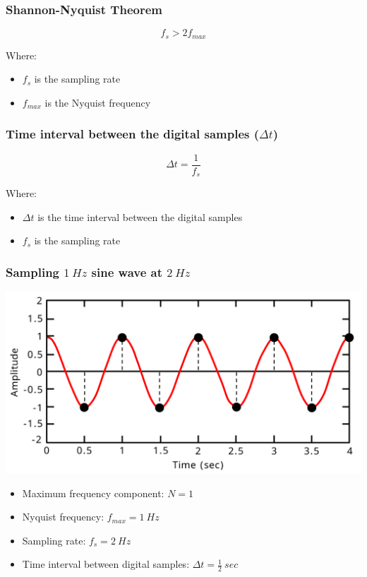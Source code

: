 \documentclass[11pt]{article}
\begin{document}
\subsubsection{Shannon-Nyquist Theorem}
\label{sec:org3bcc8e0}
\[f_s > 2f_{max}\]

Where:
\begin{itemize}
\item \(f_s\) is the sampling rate
\item \(f_{max}\) is the Nyquist frequency
\end{itemize}
\subsubsection{Time interval between the digital samples (\(\Delta t\))}
\label{sec:org41d8989}
\[\Delta t = \frac{1}{f_s}\]

Where:
\begin{itemize}
\item \(\Delta t\) is the time interval between the digital samples
\item \(f_s\) is the sampling rate
\end{itemize}
\subsubsection{Sampling \(\qty{1}{Hz}\) sine wave at \(\qty{2}{Hz}\)}
\label{sec:org871a238}
\begin{center}
\includegraphics[width=.9\linewidth]{./images/sampling-1hz-sine-wave-at-2hz.png}
\end{center}

\begin{itemize}
\item Maximum frequency component: \(N = 1\)
\item Nyquist frequency: \(f_{max} = \qty{1}{Hz}\)
\item Sampling rate: \(f_s = \qty{2}{Hz}\)
\item Time interval between digital samples: \(\Delta t = \frac{1}{2} \ \unit{sec}\)
\end{itemize}
\end{document}
